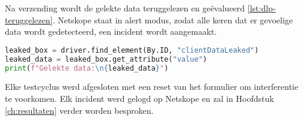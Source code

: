 Na verzending wordt de gelekte data teruggelezen en geëvalueerd \ref{lst:dlp-teruggelezen}. Netskope staat in alert modus, zodat alle keren dat er gevoelige data wordt gedetecteerd, een incident wordt aangemaakt. 

{\small
\begin{lstlisting}[language=Python, caption={Versturen van batches via Selenium},label={lst:dlp-teruggelezen}, captionpos=b, basicstyle=\small\ttfamily]
leaked_box = driver.find_element(By.ID, "clientDataLeaked")
leaked_data = leaked_box.get_attribute("value")
print(f"Gelekte data:\n{leaked_data}")
\end{lstlisting}
}

Elke testcyclus werd afgesloten met een reset van het formulier om interferentie te voorkomen. 
Elk incident werd gelogd op Netskope en zal in Hoofdstuk \ref{ch:resultaten} verder worden besproken.


    
    
    
    
    
    
